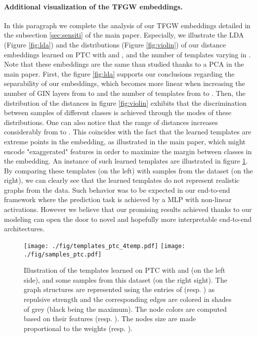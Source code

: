 \documentclass{article}
\begin{document}
{\paragraph{Additional visualization of the TFGW embeddings.} In this paragraph we complete the analysis of our TFGW embeddings detailed in the subsection \ref{sec:sensiti} of the main paper. Especially, we illustrate the LDA (Figure \ref{fig:lda}) and the distributions (Figure \ref{fig:violin}) of our distance embeddings learned on PTC with  and , and the number of templates  varying in . Note that these embeddings are the same than studied thanks to a PCA in the main paper. First, the figure \ref{fig:lda} supports our conclusions regarding the separability of our embeddings, which becomes more linear when increasing the number of GIN layers from  to  and the number of templates from  to . Then, the distribution of the distances in figure \ref{fig:violin} exhibits that the discrimination between samples of different classes is achieved through the modes of these distributions. One can also notice that the range of distances increases considerably from  to . This coincides with the fact that the learned templates are extreme points in the embedding, as illustrated in the main paper, which might encode "exaggerated" features in order to maximize the margin between classes in the embedding. An instance of such learned templates are illustrated in figure \ref{fig:templates}. By comparing these templates (on the left) with samples from the dataset (on the right), we can clearly see that the learned templates do not represent realistic graphs from the data. Such behavior was to be expected in our end-to-end framework where the prediction task is achieved by a MLP with non-linear activations. However we believe that our promising results achieved thanks to our  modeling can open the door to novel and
hopefully more interpretable end-to-end architectures.
\begin{figure}[!t]
	\begin{center}
			\texttt{[image: ./fig/templates\_ptc\_4temp.pdf]} \hfill \texttt{[image: ./fig/samples\_ptc.pdf]}
	\end{center}
\caption{\label{fig:templates} Illustration of the templates learned on PTC with  and  (on the left side), and some samples from this dataset (on the right sight). The graph structures are represented using the entries of  (resp. ) as repulsive strength and the corresponding edges are colored in shades of grey (black being the maximum). The node colors are computed based on their features  (resp. ). The nodes size are made proportional to the weights  (resp. ).}
\end{figure}

}
\end{document}
